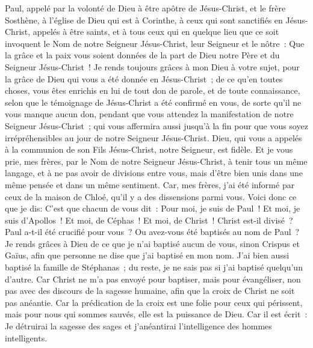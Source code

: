 \begin{multicols}{2}
\VerseOne{}Paul, appelé par la volonté de Dieu à être apôtre de Jésus-Christ, et le frère Sosthène,
à l'église de Dieu qui est à Corinthe, à ceux qui sont sanctifiés en Jésus-Christ, appelés à être saints, et à tous ceux qui en quelque lieu que ce soit invoquent le Nom de notre Seigneur Jésus-Christ, leur Seigneur et le nôtre~:
Que la grâce et la paix vous soient données de la part de Dieu notre Père et du Seigneur Jésus-Christ~!
Je rends toujours grâces à mon Dieu à votre sujet, pour la grâce de Dieu qui vous a été donnée en Jésus-Christ~;
de ce qu'en toutes choses, vous êtes enrichis en lui de tout don de parole, et de toute connaissance,
selon que le témoignage de Jésus-Christ a été confirmé en vous,
de sorte qu'il ne vous manque aucun don, pendant que vous attendez la manifestation de notre Seigneur Jésus-Christ~;
qui vous affermira aussi jusqu'à la fin pour que vous soyez irrépréhensibles au jour de notre Seigneur Jésus-Christ.
Dieu, qui vous a appelés à la communion de son Fils Jésus-Christ, notre Seigneur, est fidèle.
Et je vous prie, mes frères, par le Nom de notre Seigneur Jésus-Christ, à tenir tous un même langage, et à ne pas avoir de divisions entre vous, mais d'être bien unis dans une même pensée et dans un même sentiment.
Car, mes frères, j'ai été informé par ceux de la maison de Chloé, qu'il y a des dissensions parmi vous.
Voici donc ce que je dis: C'est que chacun de vous dit~: Pour moi, je suis de Paul~! Et moi, je suis d'Apollos~! Et moi, de Céphas~! Et moi, de Christ~!
Christ est-il divisé~? Paul a-t-il été crucifié pour vous~? Ou avez-vous été baptisés au nom de Paul~?
Je rends grâces à Dieu de ce que je n'ai baptisé aucun de vous, sinon Crispus et Gaïus,
afin que personne ne dise que j'ai baptisé en mon nom.
J'ai bien aussi baptisé la famille de Stéphanas~; du reste, je ne sais pas si j'ai baptisé quelqu'un d'autre.
Car Christ ne m'a pas envoyé pour baptiser, mais pour évangéliser, non pas avec des discours de la sagesse humaine, afin que la croix de Christ ne soit pas anéantie.
Car la prédication de la croix est une folie pour ceux qui périssent, mais pour nous qui sommes sauvés, elle est la puissance de Dieu.
Car il est écrit~: Je détruirai la sagesse des sages et j'anéantirai l'intelligence des hommes intelligents.

\end{multicols}

